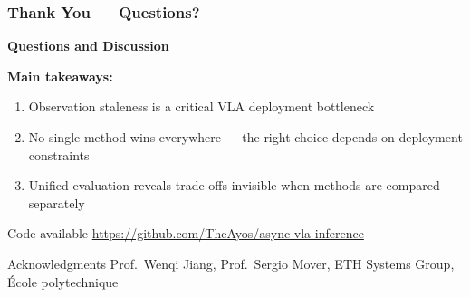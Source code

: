 \documentclass[aspectratio=1610]{beamer}
\begin{document}
\begin{frame}
\frametitle{Thank You --- Questions?}

\begin{center}
\Large
\textbf{Questions and Discussion}
\end{center}

\vspace{1em}
\textbf{Main takeaways:}
\begin{enumerate}
    \item Observation staleness is a critical VLA deployment bottleneck
    \item No single method wins everywhere --- the right choice depends on deployment constraints
    \item Unified evaluation reveals trade-offs invisible when methods are compared separately
\end{enumerate}

\vspace{1em}
\begin{block}{Code available}
\url{https://github.com/TheAyos/async-vla-inference}
\end{block}

\begin{block}{Acknowledgments}
Prof.\ Wenqi Jiang, Prof.\ Sergio Mover, ETH Systems Group, \'Ecole polytechnique
\end{block}

\end{frame}

\appendix
\end{document}
